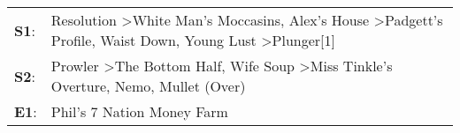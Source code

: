 \begin{supertabular}{p{0.03\textwidth}p{0.92\textwidth}}
 \textbf{S1}:  &  Resolution\textsuperscript{} \textgreater \enspace White Man's Moccasins\textsuperscript{}, \enspace Alex's House\textsuperscript{} \textgreater \enspace Padgett's Profile\textsuperscript{}, \enspace Waist Down\textsuperscript{}, \enspace Young Lust\textsuperscript{} \textgreater \enspace Plunger[1]\textsuperscript{}  \enspace  \\
 \textbf{S2}:  &                                                               Prowler\textsuperscript{} \textgreater \enspace The Bottom Half\textsuperscript{}, \enspace Wife Soup\textsuperscript{} \textgreater \enspace Miss Tinkle's Overture\textsuperscript{}, \enspace Nemo\textsuperscript{}, \enspace Mullet (Over)\textsuperscript{}  \enspace  \\
 \textbf{E1}:  &                                                                                                                                                                                                                                                                                    Phil's 7 Nation Money Farm\textsuperscript{}  \enspace  \\
\end{supertabular}
